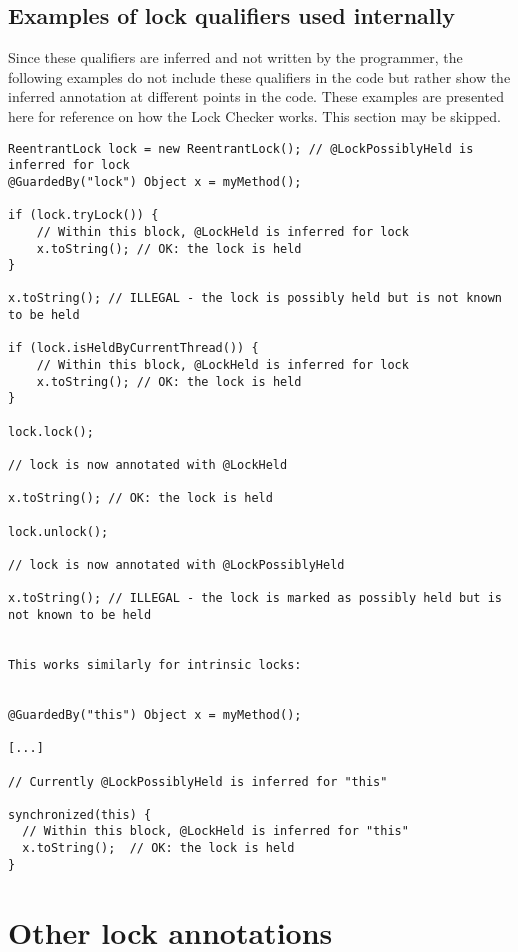 \subsection{Examples of lock qualifiers used internally\label{internal-qualifiers-examples}}

Since these qualifiers are inferred and not written by the programmer,
the following examples do not include these qualifiers in the code but
rather show the inferred annotation at different points in the code.
These examples are presented here for reference on how the Lock Checker
works.  This section may be skipped.

\begin{verbatim}
ReentrantLock lock = new ReentrantLock(); // @LockPossiblyHeld is inferred for lock
@GuardedBy("lock") Object x = myMethod();
 
if (lock.tryLock()) {
    // Within this block, @LockHeld is inferred for lock
    x.toString(); // OK: the lock is held
}
 
x.toString(); // ILLEGAL - the lock is possibly held but is not known to be held
 
if (lock.isHeldByCurrentThread()) {
    // Within this block, @LockHeld is inferred for lock
    x.toString(); // OK: the lock is held
}
 
lock.lock();

// lock is now annotated with @LockHeld
 
x.toString(); // OK: the lock is held
 
lock.unlock();

// lock is now annotated with @LockPossiblyHeld
 
x.toString(); // ILLEGAL - the lock is marked as possibly held but is not known to be held
 

This works similarly for intrinsic locks:


@GuardedBy("this") Object x = myMethod();
 
[...]
 
// Currently @LockPossiblyHeld is inferred for "this"
 
synchronized(this) {
  // Within this block, @LockHeld is inferred for "this"
  x.toString();  // OK: the lock is held
}
\end{verbatim}


\section{Other lock annotations\label{other-lock-annotations}}

